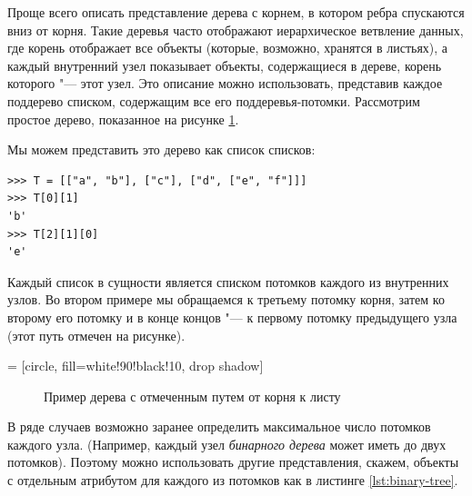 Проще всего описать представление дерева с корнем, в котором ребра спускаются вниз от корня. Такие деревья часто отображают иерархическое ветвление данных, где корень отображает все объекты (которые, возможно, хранятся в листьях), а каждый внутренний узел показывает объекты, содержащиеся в дереве, корень которого "--- этот узел. Это описание можно использовать, представив каждое поддерево списком, содержащим все его поддеревья-потомки. Рассмотрим простое дерево, показанное на рисунке \ref{fig:simple-tree}.

Мы можем представить это дерево как список списков:
\begin{lstlisting}
>>> T = [["a", "b"], ["c"], ["d", ["e", "f"]]]
>>> T[0][1]
'b'
>>> T[2][1][0]
'e'
\end{lstlisting}

Каждый список в сущности является списком потомков каждого из внутренних узлов. Во втором примере мы обращаемся к третьему потомку корня, затем ко второму его потомку и в конце концов "--- к первому потомку предыдущего узла (этот путь отмечен на рисунке).


 = [circle,
						fill=white!90!black!10,
						drop shadow]
\begin{figure}[h]
\centering
{}
\caption{Пример дерева с отмеченным путем от корня к листу}
\label{fig:simple-tree}
\end{figure}


В ряде случаев возможно заранее определить максимальное число потомков каждого узла. (Например, каждый узел \textit{бинарного дерева} может иметь до двух потомков). Поэтому можно использовать другие представления, скажем, объекты с отдельным атрибутом для каждого из потомков как в листинге \ref{lst:binary-tree}.

